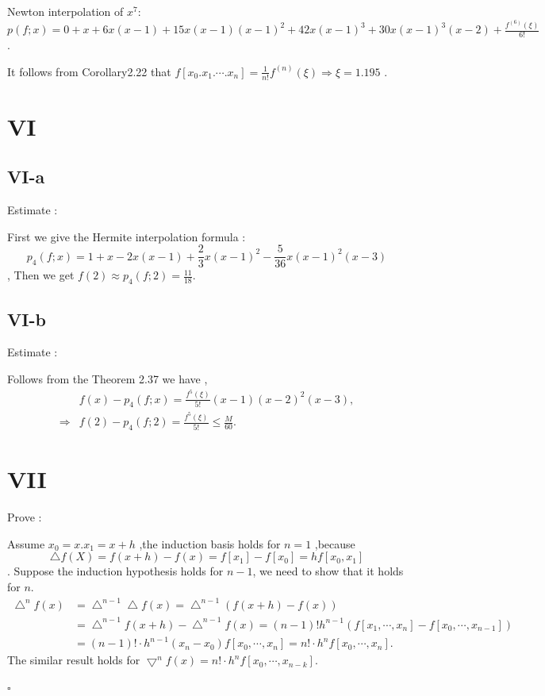 \documentclass[a4paper]{article}
\begin{document}
Newton interpolation of $x^{7}$:$p(f;x)=0+x+6x(x-1)+15x(x-1)(x-1)^{2}+42x(x-1)^{3}+30x(x-1)^{3}(x-2)+\frac{f^{(6)}(\xi)}{6!}$.

It follows from Corollary2.22 that $f[x_{0}.x_{1}.\cdots.x_{n}]=\frac{1}{n!}f^{(n)}(\xi) \Rightarrow \xi= 1.195$ .

\section*{VI}

\subsection*{VI-a}
Estimate :

First we give the Hermite interpolation formula :
$$p_{4}(f;x)=1+x-2x(x-1)+\frac{2}{3}x(x-1)^{2}-\frac{5}{36}x(x-1)^{2}(x-3)$$,
Then we get $f(2)\approx p_{4}(f;2)=\frac{11}{18}.$

\subsection*{VI-b}
Estimate :

Follows from the Theorem 2.37 we have ,
\begin{align}
    &f(x)-p_{4}(f;x) =\frac{f^{5}(\xi)}{5!}(x-1)(x-2)^{2}(x-3) ,\\
    \Rightarrow &f(2)-p_{4}(f;2)  = \frac{f^{5}(\xi)}{5!} \leq \frac{M}{60}.
\end{align}

\section*{VII}
Prove :

Assume $x_{0}=x $.$x_{1}=x+h$ ,the induction basis holds for $n=1$ ,because
$$\bigtriangleup f(X)=f(x+h)-f(x)=f[x_{1}]-f[x_{0}]=hf[x_{0},x_{1}]$$.
Suppose the induction hypothesis holds for $n-1$, we need to show that it holds for $n$.
\begin{align}
    \bigtriangleup ^{n} f(x)&= \bigtriangleup^{n-1} \bigtriangleup f(x)=\bigtriangleup ^{n-1}(f(x+h)-f(x)) \\
    &=\bigtriangleup ^{n-1}f(x+h)-\bigtriangleup ^{n-1}f(x)=(n-1)!h^{n-1}(f[x_{1},\cdots,x_{n}]-f[x_{0},\cdots,x_{n-1}])\\
    &=(n-1)!\cdot h^{n-1}(x_{n}-x_{0})f[x_{0},\cdots,x_{n}]= n!\cdot h^{n}f[x_{0},\cdots,x_{n}].
\end{align}
The similar result holds for $\bigtriangledown ^{n} f(x)=n!\cdot h^{n}f[x_{0},\cdots,x_{n-k}]$.
\begin{flushright} 
    $\square$ 
\end{flushright} 
\end{document}
